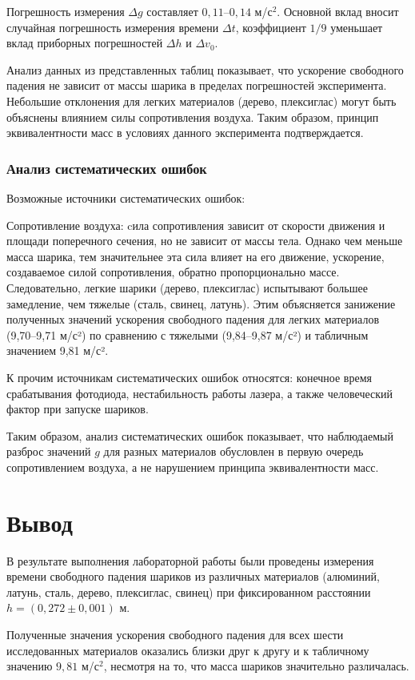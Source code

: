 \documentclass[a4paper,14pt]{extarticle}
\theoremstyle{plain}
\theoremstyle{remark}
\theoremstyle{definition}
\begin{document}
Погрешность измерения $\Delta g$ составляет $0,11$–$0,14$ м/с$^2$. Основной вклад вносит случайная погрешность измерения времени $\Delta t$, коэффициент $1/9$ уменьшает вклад приборных погрешностей $\Delta h$ и $\Delta v_0$.

Анализ данных из представленных таблиц показывает, что ускорение свободного падения не зависит от массы шарика в пределах погрешностей эксперимента. Небольшие отклонения для легких материалов (дерево, плексиглас) могут быть объяснены влиянием силы сопротивления воздуха. Таким образом, принцип эквивалентности масс в условиях данного эксперимента подтверждается.
\subsubsection{Анализ систематических ошибок}
Возможные источники систематических ошибок:


Сопротивление воздуха: cила сопротивления зависит от скорости движения и площади поперечного сечения, но не зависит от массы тела. Однако чем меньше масса шарика, тем значительнее эта сила влияет на его движение, ускорение, создаваемое силой сопротивления, обратно пропорционально массе. Следовательно, легкие шарики (дерево, плексиглас) испытывают большее замедление, чем тяжелые (сталь, свинец, латунь). Этим объясняется занижение полученных значений ускорения свободного падения для легких материалов (9,70–9,71 м/с²) по сравнению с тяжелыми (9,84–9,87 м/с²) и табличным значением 9,81 м/с².

К прочим источникам систематических ошибок относятся: конечное время срабатывания фотодиода, нестабильность работы лазера, а также человеческий фактор при запуске шариков.

Таким образом, анализ систематических ошибок показывает, что наблюдаемый разброс значений $g$ для разных материалов обусловлен в первую очередь сопротивлением воздуха, а не нарушением принципа эквивалентности масс. 

\section{Вывод}

В результате выполнения лабораторной работы были проведены измерения времени свободного падения шариков из различных материалов (алюминий, латунь, сталь, дерево, плексиглас, свинец) при фиксированном расстоянии $h = (0,272 \pm 0,001)$ м.

Полученные значения ускорения свободного падения для всех шести исследованных материалов оказались близки друг к другу и к табличному значению $9,81$ м/с$^2$, несмотря на то, что масса шариков значительно различалась.
\end{document}
